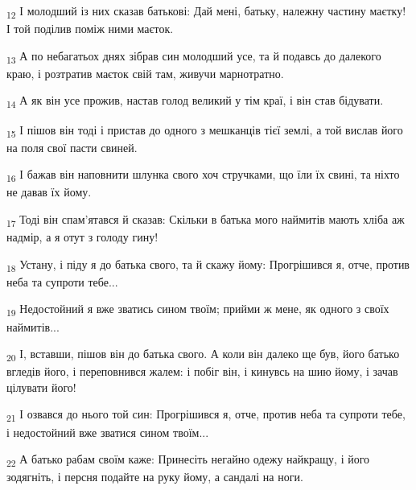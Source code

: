 \begin{tcolorbox}
\textsubscript{12} І молодший із них сказав батькові: Дай мені, батьку, належну частину маєтку! І той поділив поміж ними маєток.
\end{tcolorbox}
\begin{tcolorbox}
\textsubscript{13} А по небагатьох днях зібрав син молодший усе, та й подавсь до далекого краю, і розтратив маєток свій там, живучи марнотратно.
\end{tcolorbox}
\begin{tcolorbox}
\textsubscript{14} А як він усе прожив, настав голод великий у тім краї, і він став бідувати.
\end{tcolorbox}
\begin{tcolorbox}
\textsubscript{15} І пішов він тоді і пристав до одного з мешканців тієї землі, а той вислав його на поля свої пасти свиней.
\end{tcolorbox}
\begin{tcolorbox}
\textsubscript{16} І бажав він наповнити шлунка свого хоч стручками, що їли їх свині, та ніхто не давав їх йому.
\end{tcolorbox}
\begin{tcolorbox}
\textsubscript{17} Тоді він спам'ятався й сказав: Скільки в батька мого наймитів мають хліба аж надмір, а я отут з голоду гину!
\end{tcolorbox}
\begin{tcolorbox}
\textsubscript{18} Устану, і піду я до батька свого, та й скажу йому: Прогрішився я, отче, против неба та супроти тебе...
\end{tcolorbox}
\begin{tcolorbox}
\textsubscript{19} Недостойний я вже зватись сином твоїм; прийми ж мене, як одного з своїх наймитів...
\end{tcolorbox}
\begin{tcolorbox}
\textsubscript{20} І, вставши, пішов він до батька свого. А коли він далеко ще був, його батько вгледів його, і переповнився жалем: і побіг він, і кинувсь на шию йому, і зачав цілувати його!
\end{tcolorbox}
\begin{tcolorbox}
\textsubscript{21} І озвався до нього той син: Прогрішився я, отче, против неба та супроти тебе, і недостойний вже зватися сином твоїм...
\end{tcolorbox}
\begin{tcolorbox}
\textsubscript{22} А батько рабам своїм каже: Принесіть негайно одежу найкращу, і його зодягніть, і персня подайте на руку йому, а сандалі на ноги.
\end{tcolorbox}
